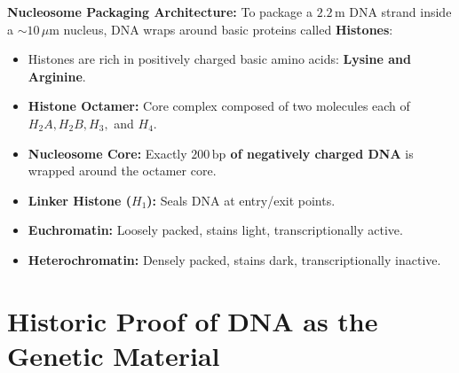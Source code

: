 \documentclass[10pt,twoside,openright]{book}
\begin{document}
\begin{formulabox}
\textbf{Nucleosome Packaging Architecture:}
To package a $2.2\,\mathrm{m}$ DNA strand inside a $\sim 10\,\mu\mathrm{m}$ nucleus, DNA wraps around basic proteins called \textbf{Histones}:
\begin{itemize}
  \item Histones are rich in positively charged basic amino acids: \textbf{Lysine and Arginine}.
  \item \textbf{Histone Octamer:} Core complex composed of two molecules each of $H_2A, H_2B, H_3,$ and $H_4$.
  \item \textbf{Nucleosome Core:} Exactly \textbf{$200\,\mathrm{bp}$ of negatively charged DNA} is wrapped around the octamer core.
  \item \textbf{Linker Histone ($H_1$):} Seals DNA at entry/exit points.
  \item \textbf{Euchromatin:} Loosely packed, stains light, transcriptionally active.
  \item \textbf{Heterochromatin:} Densely packed, stains dark, transcriptionally inactive.
\end{itemize}
\end{formulabox}

\section{Historic Proof of DNA as the Genetic Material}
\end{document}
